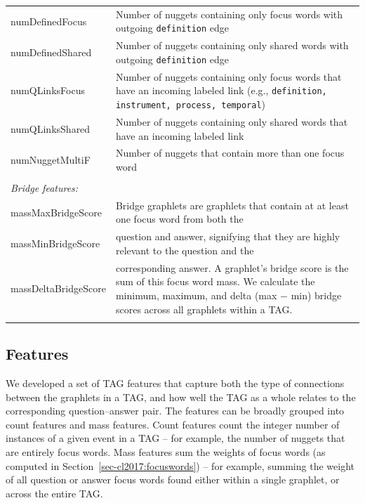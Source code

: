 \begin{table}[]
{\begin{tabular}{p{30mm}p{95mm}}
numDefinedFocus		&	Number of nuggets containing only focus words with outgoing {\tt definition} edge \\
numDefinedShared	&	Number of nuggets containing only shared words with outgoing {\tt definition} edge \\
numQLinksFocus		&	Number of nuggets containing only focus words that have an incoming labeled link (e.g., {\tt definition, instrument, process, temporal})  \\
numQLinksShared		&	Number of nuggets containing only shared words that have an incoming labeled link  \\
numNuggetMultiF		&	Number of nuggets that contain more than one focus word\\
\\
\multicolumn{2}{l}{\emph{Bridge features:}} \\
massMaxBridgeScore		&	Bridge graphlets are graphlets that contain at at least one focus word from both the  \\
massMinBridgeScore		&	question and answer, signifying that they are highly relevant to the question and the \\
massDeltaBridgeScore	&	corresponding answer. A   graphlet's bridge score is the sum of this focus word mass.  We calculate the minimum, maximum, and delta (max $-$ min) bridge scores across all graphlets within a TAG. \\
\\



\hline
\end{tabular}
}
\label{tab:features}
\end{table}


\subsection {Features} 
\label{sec-cl2017:featuresandscoring}

We developed a set of TAG features that capture both the type of connections between the graphlets in a TAG, and how well the TAG as a whole relates to the corresponding question--answer pair.
The features can be broadly grouped into count features and mass features. Count features count the integer number of instances of a given event in a TAG -- for example, the number of nuggets that are entirely focus words.  Mass features sum the weights of focus words (as computed in Section~\ref{sec-cl2017:focuswords}) -- for example, summing the weight of all question or answer focus words found either within a single graphlet, or across the entire TAG.

